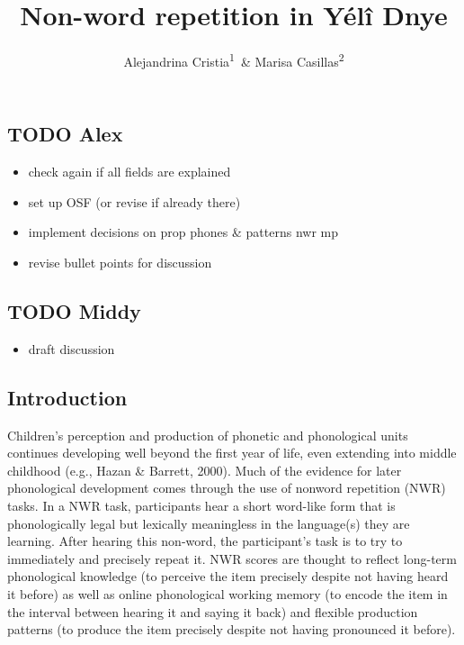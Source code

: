 \documentclass[english,,man,floatsintext]{apa6}
\title{Non-word repetition in Yélî Dnye}
\author{Alejandrina Cristia\textsuperscript{1}~\& Marisa
Casillas\textsuperscript{2}}
\date{}
\providecommand{\tightlist}{%
  \setlength{\itemsep}{0pt}\setlength{\parskip}{0pt}}
\begin{document}
\maketitle

\subsection{TODO Alex}\label{todo-alex}

\begin{itemize}
\tightlist
\item
  check again if all fields are explained
\item
  set up OSF (or revise if already there)
\item
  implement decisions on prop phones \& patterns nwr mp
\item
  revise bullet points for discussion
\end{itemize}

\subsection{TODO Middy}\label{todo-middy}

\begin{itemize}
\tightlist
\item
  draft discussion
\end{itemize}

\subsection{Introduction}\label{introduction}

Children's perception and production of phonetic and phonological units
continues developing well beyond the first year of life, even extending
into middle childhood (e.g., Hazan \& Barrett, 2000). Much of the
evidence for later phonological development comes through the use of
nonword repetition (NWR) tasks. In a NWR task, participants hear a short
word-like form that is phonologically legal but lexically meaningless in
the language(s) they are learning. After hearing this non-word, the
participant's task is to try to immediately and precisely repeat it. NWR
scores are thought to reflect long-term phonological knowledge (to
perceive the item precisely despite not having heard it before) as well
as online phonological working memory (to encode the item in the
interval between hearing it and saying it back) and flexible production
patterns (to produce the item precisely despite not having pronounced it
before).
\end{document}

